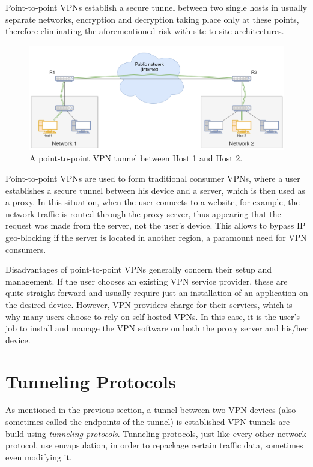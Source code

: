 \documentclass[a4paper,12pt]{report}
\begin{document}
		Point-to-point VPNs establish a secure tunnel between two single hosts in usually separate networks, encryption and decryption taking place only at these points, therefore eliminating the aforementioned risk with site-to-site architectures.
		\begin{figure}[h]
			\includegraphics[width=\textwidth]{point-to-point_VPN}
			\centering
			\caption{A point-to-point VPN tunnel between Host 1 and Host 2.}
			\label{fig:point-to-point_VPN}
		\end{figure}
		
		Point-to-point VPNs are used to form traditional consumer VPNs, where a user establishes a secure tunnel between his device and a server, which is then used as a proxy. In this situation, when the user connects to a website, for example, the network traffic is routed through the proxy server, thus appearing that the request was made from the server, not the user's device. This allows to bypass IP geo-blocking if the server is located in another region, a paramount need for VPN consumers.
		
		Disadvantages of point-to-point VPNs generally concern their setup and management. If the user chooses an existing VPN service provider, these are quite straight-forward and usually require just an installation of an application on the desired device. However, VPN providers charge for their services, which is why many users choose to rely on self-hosted VPNs. In this case, it is the user's job to install and manage the VPN software on both the proxy server and his/her device.
		
		\section{Tunneling Protocols}
		As mentioned in the previous section, a tunnel between two VPN devices (also sometimes called the endpoints of the tunnel) is established 
		VPN tunnels are build using \textit{tunneling protocols}. Tunneling protocols, just like every other network protocol, use encapsulation, in order to repackage certain traffic data, sometimes even modifying it.
		
\end{document}
